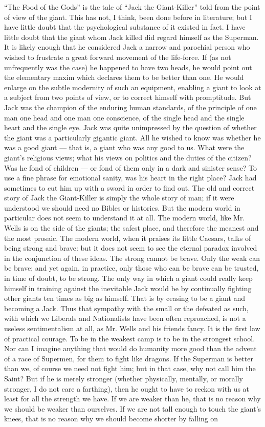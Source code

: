 “The Food of the Gods” is the tale of “Jack the Giant-Killer” told from the point of view of the giant. This has not, I think, been done before in literature; but I have little doubt that the psychological substance of it existed in fact. I have little doubt that the giant whom Jack killed did regard himself as the Superman. It is likely enough that he considered Jack a narrow and parochial person who wished to frustrate a great forward movement of the life-force. If (as not unfrequently was the case) he happened to have two heads, he would point out the elementary maxim which declares them to be better than one. He would enlarge on the subtle modernity of such an equipment, enabling a giant to look at a subject from two points of view, or to correct himself with promptitude. But Jack was the champion of the enduring human standards, of the principle of one man one head and one man one conscience, of the single head and the single heart and the single eye. Jack was quite unimpressed by the question of whether the giant was a particularly gigantic giant. All he wished to know was whether he was a good giant — that is, a giant who was any good to us. What were the giant’s religious views; what his views on politics and the duties of the citizen? Was he fond of children — or fond of them only in a dark and sinister sense? To use a fine phrase for emotional sanity, was his heart in the right place? Jack had sometimes to cut him up with a sword in order to find out. The old and correct story of Jack the Giant-Killer is simply the whole story of man; if it were understood we should need no Bibles or histories. But the modern world in particular does not seem to understand it at all. The modern world, like Mr. Wells is on the side of the giants; the safest place, and therefore the meanest and the most prosaic. The modern world, when it praises its little Caesars, talks of being strong and brave: but it does not seem to see the eternal paradox involved in the conjunction of these ideas. The strong cannot be brave. Only the weak can be brave; and yet again, in practice, only those who can be brave can be trusted, in time of doubt, to be strong. The only way in which a giant could really keep himself in training against the inevitable Jack would be by continually fighting other giants ten times as big as himself. That is by ceasing to be a giant and becoming a Jack. Thus that sympathy with the small or the defeated as such, with which we Liberals and Nationalists have been often reproached, is not a useless sentimentalism at all, as Mr. Wells and his friends fancy. It is the first law of practical courage. To be in the weakest camp is to be in the strongest school. Nor can I imagine anything that would do humanity more good than the advent of a race of Supermen, for them to fight like dragons. If the Superman is better than we, of course we need not fight him; but in that case, why not call him the Saint? But if he is merely stronger (whether physically, mentally, or morally stronger, I do not care a farthing), then he ought to have to reckon with us at least for all the strength we have. If we are weaker than he, that is no reason why we should be weaker than ourselves. If we are not tall enough to touch the giant’s knees, that is no reason why we should become shorter by falling on 